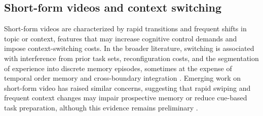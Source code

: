 \documentclass[10pt, twocolumn]{article}
\begin{document}
\subsection{Short-form videos and context switching}
Short-form videos are characterized by rapid transitions and frequent shifts in topic or context, features that may increase cognitive control demands and impose context-switching costs. In the broader literature, switching is associated with interference from prior task sets, reconfiguration costs, and the segmentation of experience into discrete memory episodes, sometimes at the expense of temporal order memory and cross-boundary integration \cite{Monsell2003TaskS, Kiesel2010ControlAI, Wang2021SwitchingTS}. Emerging work on short-form video has raised similar concerns, suggesting that rapid swiping and frequent context changes may impair prospective memory or reduce cue-based task preparation, although this evidence remains preliminary \cite{Barton2025ContextswitchingIS, Luo2025SwipingDS}.

\end{document}
